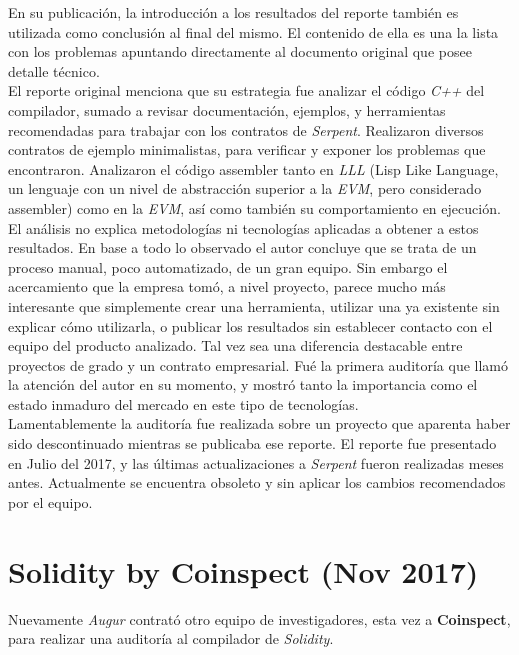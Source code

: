 En su publicación\cite{SerpentCompilerAuditZep}, la introducción a los resultados del reporte también es utilizada como conclusión al final del mismo. El contenido de ella es una la lista con los problemas apuntando directamente al documento original que posee detalle técnico.\\

El reporte original menciona que su estrategia fue analizar el código \textit{C++} del compilador, sumado a revisar documentación, ejemplos, y herramientas recomendadas para trabajar con los contratos de \textit{Serpent}. Realizaron diversos contratos de ejemplo minimalistas, para verificar y exponer los problemas que encontraron. Analizaron el código assembler tanto en \textit{LLL} (Lisp Like Language, un lenguaje con un nivel de abstracción superior a la \textit{EVM}, pero considerado assembler) como en la \textit{EVM}, así como también su comportamiento en ejecución.\\

El análisis no explica metodologías ni tecnologías aplicadas a obtener a estos resultados. En base a todo lo observado el autor concluye que se trata de un proceso manual, poco automatizado, de un gran equipo. Sin embargo el acercamiento que la empresa tomó, a nivel proyecto, parece mucho más interesante que simplemente crear una herramienta, utilizar una ya existente sin explicar cómo utilizarla, o publicar los resultados sin establecer contacto con el equipo del producto analizado. Tal vez sea una diferencia destacable entre proyectos de grado y un contrato empresarial.
Fué la primera auditoría que llamó la atención del autor en su momento, y mostró tanto la importancia como el estado inmaduro del mercado en este tipo de tecnologías.\\ 

Lamentablemente la auditoría fue realizada sobre un proyecto que aparenta haber sido descontinuado mientras se publicaba ese reporte. El reporte fue presentado en Julio del 2017, y las últimas actualizaciones a \textit{Serpent} fueron realizadas meses antes. Actualmente se encuentra obsoleto y sin aplicar los cambios recomendados por el equipo.


\section{Solidity by Coinspect (Nov 2017)}
Nuevamente \textit{Augur} contrató otro equipo de investigadores, esta vez a \textbf{Coinspect}, para realizar una auditoría al compilador de \textit{Solidity}.\\

